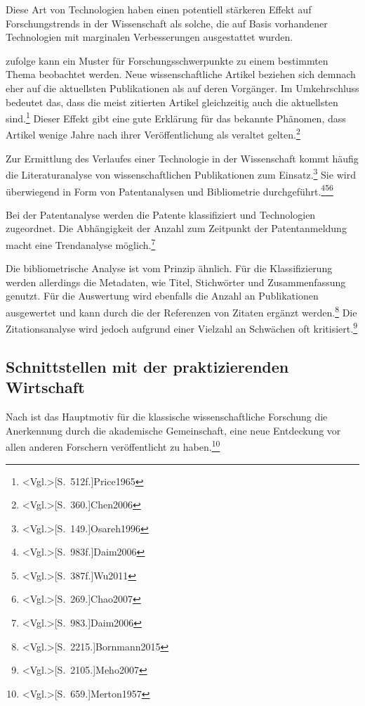 Diese Art von Technologien haben einen potentiell stärkeren Effekt auf Forschungstrends in der Wissenschaft als solche, die auf Basis vorhandener Technologien mit marginalen Verbesserungen ausgestattet wurden.

 zufolge kann ein Muster für Forschungsschwerpunkte zu einem bestimmten Thema beobachtet werden. Neue wissenschaftliche Artikel beziehen sich demnach eher auf die aktuellsten Publikationen als auf deren Vorgänger. Im Umkehrschluss bedeutet das, dass die meist zitierten Artikel gleichzeitig auch die aktuellsten sind.\footnote{\citeNP<Vgl.>[S.~512f.]{Price1965}} Dieser Effekt gibt eine gute Erklärung für das bekannte Phänomen, dass Artikel wenige Jahre nach ihrer Veröffentlichung als veraltet gelten.\footnote{\citeNP<Vgl.>[S.~360.]{Chen2006}}

Zur Ermittlung des Verlaufes einer Technologie in der Wissenschaft kommt häufig die Literaturanalyse von wissenschaftlichen Publikationen zum Einsatz.\footnote{\citeNP<Vgl.>[S.~149.]{Osareh1996}} Sie wird überwiegend in Form von Patentanalysen und Bibliometrie durchgeführt.\footnote{\citeNP<Vgl.>[S.~983f.]{Daim2006}}\footnote{\citeNP<Vgl.>[S.~387f.]{Wu2011}}\footnote{\citeNP<Vgl.>[S.~269.]{Chao2007}}

Bei der Patentanalyse werden die Patente klassifiziert und Technologien zugeordnet. Die Abhängigkeit der Anzahl zum Zeitpunkt der Patentanmeldung macht eine Trendanalyse möglich.\footnote{\citeNP<Vgl.>[S.~983.]{Daim2006}}

Die bibliometrische Analyse ist vom Prinzip ähnlich. Für die Klassifizierung werden allerdings die Metadaten, wie Titel, Stichwörter und Zusammenfassung genutzt. Für die Auswertung wird ebenfalls die Anzahl an Publikationen ausgewertet und kann durch die der Referenzen von Zitaten ergänzt werden.\footnote{\citeNP<Vgl.>[S.~2215.]{Bornmann2015}} Die Zitationsanalyse wird jedoch aufgrund einer Vielzahl an Schwächen oft kritisiert.\footnote{\citeNP<Vgl.>[S.~2105.]{Meho2007}}

\subsection{Schnittstellen mit der praktizierenden Wirtschaft}
Nach  ist das Hauptmotiv für die klassische wissenschaftliche Forschung die Anerkennung durch die akademische Gemeinschaft, eine neue Entdeckung vor allen anderen Forschern veröffentlicht zu haben.\footnote{\citeNP<Vgl.>[S.~659.]{Merton1957}}

